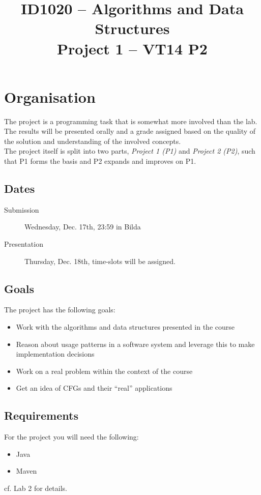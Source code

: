 \documentclass[11pt]{article}
\title{ID1020 -- Algorithms and Data Structures \\ Project 1 -- VT14 P2}
\author{}
\date{}                                           %
\begin{document}
\maketitle
\section{Organisation}
The project is a programming task that is somewhat more involved than the lab. The results will be presented orally and a grade assigned based on the quality of the solution and understanding of the involved concepts.\\

The project itself is split into two parts, \emph{Project 1 (P1)} and \emph{Project 2 (P2)}, such that P1 forms the basis and P2 expands and improves on P1.

\subsection{Dates}
\begin{description}
\item[Submission] Wednesday, Dec. 17th, 23:59 in Bilda
\item[Presentation] Thursday, Dec. 18th, time-slots will be assigned.
\end{description}

\subsection{Goals}
The project has the following goals:
\begin{itemize}
\item Work with the algorithms and data structures presented in the course
\item Reason about usage patterns in a software system and leverage this to make implementation decisions
\item Work on a real problem within the context of the course
\item Get an idea of CFGs and their ``real'' applications
\end{itemize}

\subsection{Requirements}
\label{ssec:reqs}
For the project you will need the following:
\begin{itemize}
\item Java
\item Maven
\end{itemize}
cf. Lab 2 for details.
\end{document}
